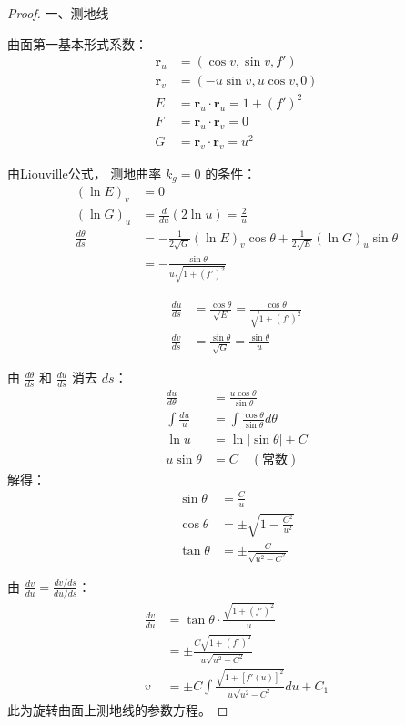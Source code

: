 \documentclass[lang=cn,10pt,thmcnt=section]{elegantbook}
\begin{document}
\begin{proof}
    
    一、测地线

曲面第一基本形式系数：
\begin{align*}
\mathbf{r}_u &= (\cos v, \sin v, f') \\
\mathbf{r}_v &= (-u \sin v, u \cos v, 0) \\
E &= \mathbf{r}_u \cdot \mathbf{r}_u = 1 + (f')^2 \\
F &= \mathbf{r}_u \cdot \mathbf{r}_v = 0 \\
G &= \mathbf{r}_v \cdot \mathbf{r}_v = u^2
\end{align*}

由Liouville公式，
测地曲率 \(k_g = 0\) 的条件：
\begin{align*}
(\ln E)_v &= 0 \\
(\ln G)_u &= \frac{d}{du}(2 \ln u) = \frac{2}{u} \\
\frac{d\theta}{ds} &= -\frac{1}{2\sqrt{G}} (\ln E)_v \cos\theta + \frac{1}{2\sqrt{E}} (\ln G)_u \sin\theta \\
&= -\frac{\sin\theta}{u\sqrt{1 + (f')^2}}
\end{align*}

\begin{align*}
\frac{du}{ds} &= \frac{\cos\theta}{\sqrt{E}} = \frac{\cos\theta}{\sqrt{1 + (f')^2}} \\
\frac{dv}{ds} &= \frac{\sin\theta}{\sqrt{G}} = \frac{\sin\theta}{u}
\end{align*}


由 \(\frac{d\theta}{ds}\) 和 \(\frac{du}{ds}\) 消去 \(ds\)：
\begin{align*}
\frac{du}{d\theta} &= \frac{u\cos\theta}{\sin\theta} \\
\int \frac{du}{u} &= \int \frac{\cos\theta}{\sin\theta} d\theta \\
\ln u &= \ln|\sin\theta| + C \\
u \sin\theta &= C \quad (\text{常数})
\end{align*}
解得：
\begin{align*}
\sin\theta &= \frac{C}{u} \\
\cos\theta &= \pm \sqrt{1 - \frac{C^2}{u^2}} \\
\tan\theta &= \pm \frac{C}{\sqrt{u^2 - C^2}}
\end{align*}


由 \(\frac{dv}{du} = \frac{dv/ds}{du/ds}\)：
\begin{align*}
\frac{dv}{du} &= \tan\theta \cdot \frac{\sqrt{1 + (f')^2}}{u} \\
&= \pm \frac{C \sqrt{1 + (f')^2}}{u \sqrt{u^2 - C^2}} \\
v &= \pm C \int \frac{\sqrt{1 + [f'(u)]^2}}{u \sqrt{u^2 - C^2}}  du + C_1
\end{align*}
此为旋转曲面上测地线的参数方程。


\end{proof}
\end{document}
